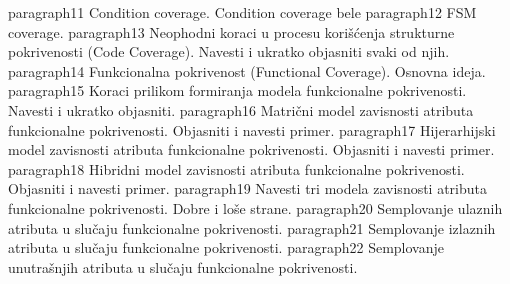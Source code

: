 paragraph{11 Condition coverage.}
\indent Condition coverage bele
paragraph{12 FSM coverage.}
paragraph{13 Neophodni koraci u procesu korišćenja strukturne pokrivenosti (Code Coverage). Navesti i ukratko objasniti svaki od njih.}
paragraph{14 Funkcionalna pokrivenost (Functional Coverage). Osnovna ideja.}
paragraph{15 Koraci prilikom formiranja modela funkcionalne pokrivenosti. Navesti i ukratko objasniti.}
paragraph{16 Matrični model zavisnosti atributa funkcionalne pokrivenosti. Objasniti i navesti primer.}
paragraph{17 Hijerarhijski model zavisnosti atributa funkcionalne pokrivenosti. Objasniti i navesti primer.}
paragraph{18 Hibridni model zavisnosti atributa funkcionalne pokrivenosti. Objasniti i navesti primer.}
paragraph{19 Navesti tri modela zavisnosti atributa funkcionalne pokrivenosti. Dobre i loše strane.}
paragraph{20 Semplovanje ulaznih atributa u slučaju funkcionalne pokrivenosti.}
paragraph{21 Semplovanje izlaznih atributa u slučaju funkcionalne pokrivenosti.}
paragraph{22 Semplovanje unutrašnjih atributa u slučaju funkcionalne pokrivenosti.}
